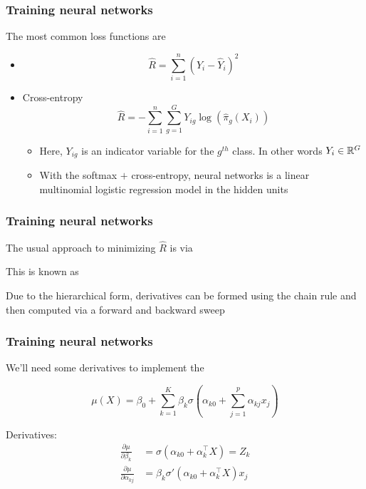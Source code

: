 \documentclass[12pt]{beamer}
\begin{document}
\begin{frame}[fragile]
\frametitle{Training neural networks}
The most common loss functions are
\begin{itemize}
\item {} 
\[
\hat{R} = \sum_{i = 1}^n (Y_i - \hat{Y}_i)^2
\]
\item {}  Cross-entropy
\[
\hat{R} = -\sum_{i = 1}^n \sum_{g=1}^G Y_{ig} \log( \hat{\pi}_g(X_i))
\]
\begin{itemize}
\item Here, $Y_{ig}$ is an indicator variable for the $g^{th}$ class.  In other words $Y_i \in \mathbb{R}^G$

\item With the softmax $+$ cross-entropy, neural networks is a linear multinomial logistic regression model in the
hidden units
\end{itemize}
\end{itemize}

\end{frame}

\begin{frame}[fragile]
\frametitle{Training neural networks}
The usual approach to minimizing $\hat{R}$ is via 

\vsp
This is known as 

\vsp
Due to the hierarchical form, derivatives can be formed using the chain rule and
then computed via a forward and backward sweep 

\end{frame}

\begin{frame}[fragile]
\frametitle{Training neural networks}
We'll need some derivatives to implement the 

\[
\mu(X) = \beta_0 + \sum_{k=1}^K \beta_k \sigma\left(\alpha_{k0} + \sum_{j=1}^p\alpha_{kj}x_j\right)
\]

\vsp
Derivatives:
\begin{align*}
\frac{\partial \mu}{\partial \beta_k} & = \sigma(\alpha_{k0} + \alpha_k^{\top}X)  = Z_k\\
\frac{\partial \mu}{\partial \alpha_{kj}} & = \beta_k\sigma'(\alpha_{k0} + \alpha_k^{\top}X)x_j
\end{align*}

\end{frame}
\end{document}
